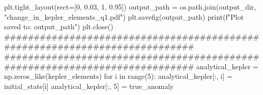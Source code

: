 {}
\markdownRendererSectionEnd \markdownRendererSectionBegin
{}\markdownRendererInterblockSeparator
{}plt.tight_layout(rect=[0, 0.03, 1, 0.95])\markdownRendererInterblockSeparator
{}
\markdownRendererSectionEnd \markdownRendererSectionBegin
{}\markdownRendererInterblockSeparator
{}output_path = os.path.join(output_dir, "change_in_kepler_elements_q1.pdf") plt.savefig(output_path) print(f"Plot saved to: {output_path}")\markdownRendererInterblockSeparator
{}
\markdownRendererSectionEnd \markdownRendererSectionBegin
{}\markdownRendererInterblockSeparator
{}
\markdownRendererSectionEnd \markdownRendererSectionBegin
{}\markdownRendererInterblockSeparator
{}plt.close()\markdownRendererInterblockSeparator
{}###########################################################################\markdownRendererInterblockSeparator
{}
\markdownRendererSectionEnd \markdownRendererSectionBegin
{}\markdownRendererInterblockSeparator
{}###########################################################################\markdownRendererInterblockSeparator
{}
\markdownRendererSectionEnd \markdownRendererSectionBegin
{}\markdownRendererInterblockSeparator
{}
\markdownRendererSectionEnd \markdownRendererSectionBegin
{}\markdownRendererInterblockSeparator
{}
\markdownRendererSectionEnd \markdownRendererSectionBegin
{}\markdownRendererInterblockSeparator
{}
\markdownRendererSectionEnd \markdownRendererSectionBegin
{}\markdownRendererInterblockSeparator
{}analytical_kepler = np.zeros_like(kepler_elements) for i in range(5): analytical_kepler[:, i] = initial_state[i] analytical_kepler[:, 5] = true_anomaly\markdownRendererInterblockSeparator
{}
\markdownRendererSectionEnd \markdownRendererSectionBegin
{}\markdownRendererInterblockSeparator
{}
\markdownRendererSectionEnd \markdownRendererSectionBegin
{}\markdownRendererInterblockSeparator
{}
\markdownRendererSectionEnd \markdownRendererSectionBegin
{}\markdownRendererInterblockSeparator
